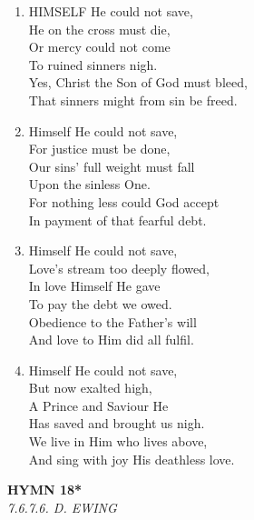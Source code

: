 \begin{enumerate}
    \item HIMSELF He could not save, \\
        He on the cross must die, \\
        Or mercy could not come \\
        To ruined sinners nigh. \\
        Yes, Christ the Son of God must bleed, \\
        That sinners might from sin be freed.

    \item Himself He could not save, \\
        For justice must be done, \\
        Our sins' full weight must fall \\
        Upon the sinless One. \\
        For nothing less could God accept \\
        In payment of that fearful debt.

    \item Himself He could not save, \\
        Love's stream too deeply flowed, \\
        In love Himself He gave \\
        To pay the debt we owed. \\
        Obedience to the Father's will \\
        And love to Him did all fulfil.

    \item Himself He could not save, \\
        But now exalted high, \\
        A Prince and Saviour He \\
        Has saved and brought us nigh. \\
        We live in Him who lives above, \\
        And sing with joy His deathless love.

\end{enumerate}

\newpage
\begin{center}
    {\Large \textbf{HYMN 18*\textdagger{}}}
    \\
    \textit{7.6.7.6. D. EWING}
\end{center}
\vspace{1em}

